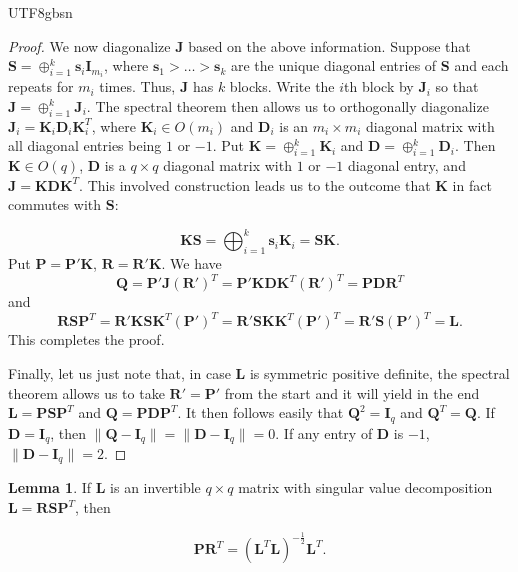 \documentclass[12pt]{report}
\theoremstyle{plain}
\theoremstyle{definition}
\newtheorem{lemma}[theorem]{Lemma}
\begin{document}
\begin{CJK*}{UTF8}{gbsn}
\begin{proof}
We now diagonalize $\bm{J}$ based on the above information.
Suppose that $\bm{S} = \oplus_{i=1}^k \bm{s}_i\bm{I}_{m_i}$,
where $\bm{s}_1 > \ldots > \bm{s}_k$ are the unique diagonal entries of 
$\bm{S}$ and each repeats for $m_i$ times.
Thus, $\bm{J}$ has $k$ blocks.
Write the $i$th block by $\bm{J}_i$ so that
$\bm{J} = \oplus_{i=1}^k \bm{J}_i$.
The spectral theorem then allows us to orthogonally diagonalize 
$\bm{J}_i = \bm{K}_i\bm{D}_i\bm{K}_i^T$,
where 
$\bm{K}_i \in O(m_i)$ and
$\bm{D}_i$ is an $m_i \times m_i$ diagonal matrix with 
all diagonal entries being $1$ or $-1$. 
Put $\bm{K} = \oplus_{i=1}^k \bm{K}_i$
and $\bm{D} = \oplus_{i=1}^k \bm{D}_i$.
Then $\bm{K} \in O(q)$, $\bm{D}$ is a $q \times q$ diagonal matrix 
with $1$ or $-1$ diagonal entry, and $\bm{J} = \bm{K}\bm{D}\bm{K}^T$.
This involved construction leads us to the outcome that 
$\bm{K}$ in fact commutes with $\bm{S}$:

\begin{equation*}
  \bm{K}\bm{S} = \bigoplus_{i=1}^k \bm{s}_i\bm{K}_i = \bm{S}\bm{K}.
\end{equation*}
Put $\bm{P} = \bm{P}'\bm{K}$,
$\bm{R} = \bm{R}'\bm{K}$.
We have 
\begin{equation*}
  \bm{Q} = \bm{P}' \bm{J} (\bm{R}')^T = \bm{P}' \bm{K}\bm{D}\bm{K}^T (\bm{R}')^T
  = \bm{P} \bm{D} \bm{R}^T
\end{equation*}
and
\begin{equation*}
  \bm{R}\bm{S}\bm{P}^T = 
  \bm{R}'\bm{K} \bm{S}\bm{K}^T(\bm{P}')^T
  = \bm{R}'\bm{S} \bm{K}\bm{K}^T(\bm{P}')^T
  = \bm{R}'\bm{S} (\bm{P}')^T =\bm{L}.
\end{equation*}
This completes the proof.

Finally, let us just note that, in case 
$\bm{L}$ is symmetric positive definite,
the spectral theorem allows us to take $\bm{R}'=\bm{P}'$ from the start 
and it will yield in the end 
$\bm{L} = \bm{P}\bm{S}\bm{P}^T$
and $\bm{Q} = \bm{P}\bm{D}\bm{P}^T$.
It then follows easily that $\bm{Q}^2 = \bm{I}_q$
and $\bm{Q}^T = \bm{Q}$. If $\bm{D} = \bm{I}_q$,
then $\|\bm{Q}-\bm{I}_q\| = \|\bm{D}-\bm{I}_q\|=0$.
If any entry of $\bm{D}$ is $-1$, $\|\bm{D}-\bm{I}_q\| = 2$.
\end{proof}

\begin{lemma}\label{thm:unique_P_R}
If $\bm{L}$ is an invertible $q \times q$ matrix
with singular value decomposition $\bm{L} = \bm{R}\bm{S}\bm{P}^T$,
then 

\begin{equation*}
  \bm{P}\bm{R}^T = (\bm{L}^T \bm{L})^{-\frac{1}{2}}\bm{L}^T.
\end{equation*}
\end{lemma}


\end{CJK*}
\end{document}
